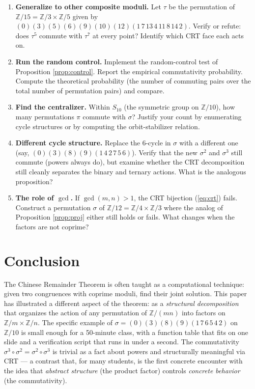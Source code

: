 \documentclass[11pt]{article}
\theoremstyle{plain}
\theoremstyle{definition}
\theoremstyle{remark}
\begin{document}
\begin{enumerate}[label=\textbf{E\arabic*.}]

\item \textbf{Generalize to other composite moduli.} Let $\tau$ be the permutation of $\mathbb{Z}/15 = \mathbb{Z}/3 \times \mathbb{Z}/5$ given by $(0)(3)(5)(6)(9)(10)(12)(1\, 7\, 13\, 4\, 11\, 8\, 14\, 2)$. Verify or refute: does $\tau^5$ commute with $\tau^7$ at every point? Identify which CRT face each acts on.

\item \textbf{Run the random control.} Implement the random-control test of Proposition \ref{prop:control}. Report the empirical commutativity probability. Compute the theoretical probability (the number of commuting pairs over the total number of permutation pairs) and compare.

\item \textbf{Find the centralizer.} Within $S_{10}$ (the symmetric group on $\mathbb{Z}/10$), how many permutations $\pi$ commute with $\sigma$? Justify your count by enumerating cycle structures or by computing the orbit-stabilizer relation.

\item \textbf{Different cycle structure.} Replace the $6$-cycle in $\sigma$ with a different one (say, $(0)(3)(8)(9)(1\,4\,2\,7\,5\,6)$). Verify that the new $\sigma^2$ and $\sigma^3$ still commute (powers always do), but examine whether the CRT decomposition still cleanly separates the binary and ternary actions. What is the analogous proposition?

\item \textbf{The role of $\gcd$.} If $\gcd(m, n) > 1$, the CRT bijection (\ref{eq:crt}) fails. Construct a permutation $\sigma$ of $\mathbb{Z}/12 = \mathbb{Z}/4 \times \mathbb{Z}/3$ where the analog of Proposition \ref{prop:proj} either still holds or fails. What changes when the factors are not coprime?

\end{enumerate}

\section{Conclusion}

The Chinese Remainder Theorem is often taught as a computational technique: given two congruences with coprime moduli, find their joint solution. This paper has illustrated a different aspect of the theorem: as a \emph{structural decomposition} that organizes the action of any permutation of $\mathbb{Z}/(mn)$ into factors on $\mathbb{Z}/m \times \mathbb{Z}/n$. The specific example of $\sigma = (0)(3)(8)(9)(1\,7\,6\,5\,4\,2)$ on $\mathbb{Z}/10$ is small enough for a 50-minute class, with a function table that fits on one slide and a verification script that runs in under a second. The commutativity $\sigma^3 \circ \sigma^2 = \sigma^2 \circ \sigma^3$ is trivial as a fact about powers and structurally meaningful via CRT --- a contrast that, for many students, is the first concrete encounter with the idea that \emph{abstract structure} (the product factor) controls \emph{concrete behavior} (the commutativity).
\end{document}
